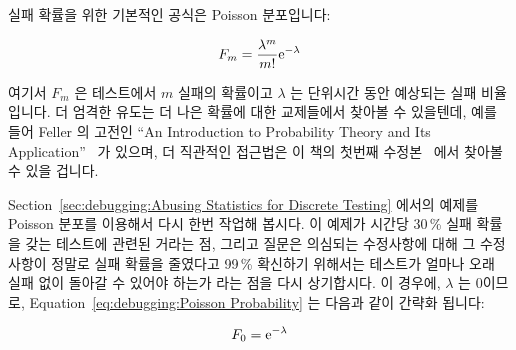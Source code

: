 실패 확률을 위한 기본적인 공식은 Poisson 분포입니다:

\begin{equation}
	F_m = \frac{\lambda^m}{m!} \mathrm{e}^{-\lambda}
\label{eq:debugging:Poisson Probability}
\end{equation}

여기서 $F_m$ 은 테스트에서 $m$ 실패의 확률이고 $\lambda$ 는 단위시간 동안
예상되는 실패 비율입니다.
더 엄격한 유도는 더 나은 확률에 대한 교제들에서 찾아볼 수 있을텐데, 예를 들어
Feller 의 고전인 ``An Introduction to Probability Theory and Its
Application''~\cite{Feller58} 가 있으며, 더 직관적인 접근법은 이 책의 첫번째
수정본~\cite{McKenney2014ParallelProgramming-e1} 에서 찾아볼 수 있을 겁니다.

Section~\ref{sec:debugging:Abusing Statistics for Discrete Testing} 에서의
예제를 Poisson 분포를 이용해서 다시 한번 작업해 봅시다.
이 예제가 시간당 30\,\% 실패 확률을 갖는 테스트에 관련된 거라는 점, 그리고
질문은 의심되는 수정사항에 대해 그 수정사항이 정말로 실패 확률을 줄였다고
99\,\% 확신하기 위해서는 테스트가 얼마나 오래 실패 없이 돌아갈 수 있어야 하는가
라는 점을 다시 상기합시다.
이 경우에, $\lambda$ 는 0이므로,
Equation~\ref{eq:debugging:Poisson Probability} 는 다음과 같이 간략화 됩니다:

\begin{equation}
	F_0 =  \mathrm{e}^{-\lambda}
\end{equation}


